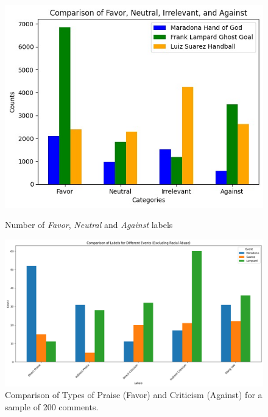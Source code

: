 \documentclass[sigconf, review]{acmart}
\begin{document}
\begin{figure}[htbp]
    \centering
    \begin{minipage}{0.48\textwidth}
        \centering
        \includegraphics[width=\textwidth, keepaspectratio]{tableonechart.jpg} %
        \caption{Number of \textit{Favor}, \textit{Neutral} and \textit{Against} labels}
        \label{fig:labels}
    \end{minipage}\hfill
    \begin{minipage}{0.48\textwidth}
        \centering
        \includegraphics[width=\textwidth, keepaspectratio]{praise_and_criticism.jpg} %
        \caption{Comparison of Types of Praise (Favor) and Criticism (Against) for a sample of 200 comments.}
        \label{fig:praise_criticism}
    \end{minipage}
\end{figure}
\end{document}
